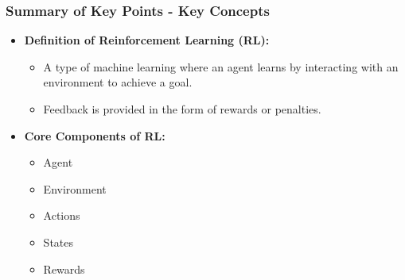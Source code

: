 \documentclass[aspectratio=169]{beamer}
\begin{document}
\begin{frame}[fragile]
    \frametitle{Summary of Key Points - Key Concepts}
    \begin{itemize}
        \item \textbf{Definition of Reinforcement Learning (RL):}
        \begin{itemize}
            \item A type of machine learning where an agent learns by interacting with an environment to achieve a goal.
            \item Feedback is provided in the form of rewards or penalties.
        \end{itemize}
        
        \item \textbf{Core Components of RL:}
        \begin{itemize}
            \item Agent
            \item Environment
            \item Actions
            \item States
            \item Rewards
        \end{itemize}
    \end{itemize}
\end{frame}
\end{document}
